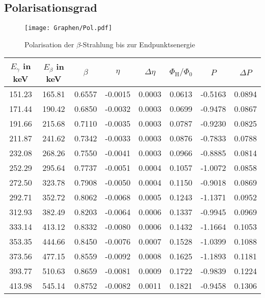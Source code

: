 \documentclass[twoside,colorback,accentcolor=tud4c,11pt]{tudreport}
\begin{document}
\subsection{Polarisationsgrad}\label{subsec:polgrad}
\begin{figure}[H]
\centering
   	\begin{minipage}[b]{1\textwidth}
   	\texttt{[image: Graphen/Pol.pdf]}
   	\caption{Polarisation der $ \beta $-Strahlung bis zur Endpunktsenergie}
  	\label{fig:P}
   	\end{minipage}
\end{figure}
\begin{table}[H]
\centering
\begin{tabular}{|c|c|c|c|c|c|c|c|}
\hline 
$ E_{\gamma} $ in keV & $ E_{\beta} $ in keV & $ \beta $ & $ \eta $ & $ \Delta\eta $ & $ \Phi_{\text{H}}/\Phi_{\text{0}} $ & $ P $ & $ \Delta P $ \\
\hline 
151.23 & 165.81 & 0.6557 & -0.0015 & 0.0003 & 0.0613 & -0.5163 & 0.0894 \\
\hline
171.44 & 190.42 & 0.6850 & -0.0032 & 0.0003 & 0.0699 & -0.9478 & 0.0867 \\
\hline
191.66 & 215.68 & 0.7110 & -0.0035 & 0.0003 & 0.0787 & -0.9230 & 0.0825 \\
\hline
211.87 & 241.62 & 0.7342 & -0.0033 & 0.0003 & 0.0876 & -0.7833 & 0.0788 \\
\hline
232.08 & 268.26 & 0.7550 & -0.0041 & 0.0003 & 0.0966 & -0.8885 & 0.0814 \\
\hline
252.29 & 295.64 & 0.7737 & -0.0051 & 0.0004 & 0.1057 & -1.0072 & 0.0858 \\
\hline
272.50 & 323.78 & 0.7908 & -0.0050 & 0.0004 & 0.1150 & -0.9018 & 0.0869 \\
\hline
292.71 & 352.72 & 0.8062 & -0.0068 & 0.0005 & 0.1243 & -1.1371 & 0.0952 \\
\hline
312.93 & 382.49 & 0.8203 & -0.0064 & 0.0006 & 0.1337 & -0.9945 & 0.0969 \\
\hline
333.14 & 413.12 & 0.8332 & -0.0080 & 0.0006 & 0.1432 & -1.1664 & 0.1053 \\
\hline
353.35 & 444.66 & 0.8450 & -0.0076 & 0.0007 & 0.1528 & -1.0399 & 0.1088 \\
\hline
373.56 & 477.15 & 0.8559 & -0.0092 & 0.0008 & 0.1625 & -1.1893 & 0.1181 \\
\hline
393.77 & 510.63 & 0.8659 & -0.0081 & 0.0009 & 0.1722 & -0.9839 & 0.1224 \\
\hline
413.98 & 545.14 & 0.8752 & -0.0082 & 0.0011 & 0.1821 & -0.9458 & 0.1306 \\

\end{tabular}
\end{table}
\end{document}
